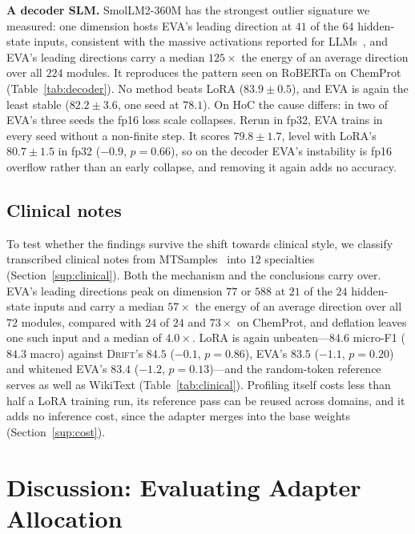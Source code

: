 \documentclass[conference]{IEEEtran}
\newcommand{\method}{\textsc{Drift}}
\begin{document}
\noindent\textbf{A decoder SLM.} SmolLM2-360M has the strongest outlier
signature we measured: one dimension hosts EVA's leading direction at $41$ of
the $64$ hidden-state inputs, consistent with the massive activations reported
for LLMs~\cite{sun2024massive}, and EVA's leading directions carry a median
$125\times$ the energy of an average direction over all $224$ modules. It
reproduces the pattern seen on RoBERTa on ChemProt (Table~\ref{tab:decoder}). No
method beats LoRA ($83.9\pm0.5$), and EVA is again the least stable
($82.2\pm3.6$, one seed at $78.1$). On HoC the cause differs: in two of EVA's
three seeds the fp16 loss scale collapses. Rerun in fp32, EVA trains in every
seed without a non-finite step. It scores $79.8\pm1.7$, level with LoRA's
$80.7\pm1.5$ in fp32 ($-0.9$, $p = 0.66$), so on the decoder EVA's instability is
fp16 overflow rather than an early collapse, and removing it again adds no
accuracy.

\subsection{Clinical notes}
\label{sec:clinical}

To test whether the findings survive the shift towards clinical style, we
classify transcribed clinical notes from MTSamples~\cite{mtsamples} into $12$
specialties (Section~\ref{sup:clinical}). Both the mechanism and the conclusions
carry over. EVA's leading directions peak on dimension $77$ or $588$ at $21$ of
the $24$ hidden-state inputs and carry a median $57\times$ the energy of an
average direction over all $72$ modules, compared with $24$ of $24$ and $73\times$
on ChemProt, and deflation leaves one such input and a median of $4.0\times$.
LoRA is again unbeaten---$84.6$ micro-F1 ($84.3$ macro) against \method{}'s
$84.5$ ($-0.1$, $p = 0.86$), EVA's $83.5$ ($-1.1$, $p = 0.20$) and whitened
EVA's $83.4$ ($-1.2$, $p = 0.13$)---and the random-token reference serves as well
as WikiText (Table~\ref{tab:clinical}). Profiling itself costs less than half a
LoRA training run, its reference pass can be reused across domains, and it adds
no inference cost, since the adapter merges into the base weights
(Section~\ref{sup:cost}).

\section{Discussion: Evaluating Adapter Allocation}
\label{sec:discussion}
\end{document}
